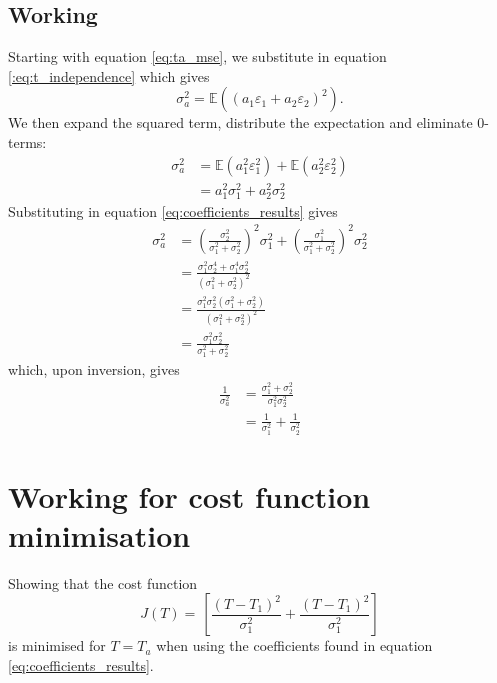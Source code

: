 \subsection{Working}
\label{sub:analysis:working}

Starting with equation \ref{eq:ta_mse}, we substitute in equation \ref{:eq:t_independence} which gives
\begin{equation*}
    \sigma_a^2 = \mathbb{E} \left( \left( a_1 \varepsilon_1 + a_2 \varepsilon_2 \right)^2 \right).
\end{equation*}
We then expand the squared term, distribute the expectation and eliminate $0$-terms:
\begin{align*}
    \sigma_a^2 &= \mathbb{E} \left( a_1^2 \varepsilon_1^2 \right) + \mathbb{E} \left( a_2^2 \varepsilon_2^2 \right) \\
                &= a_1^2 \sigma_1^2 + a_2^2 \sigma_2^2
\end{align*}
Substituting in equation \ref{eq:coefficients_results} gives
\begin{align*}
    \sigma_a^2 &= \left( \frac{\sigma_2^2}{\sigma_1^2 + \sigma_2^2} \right)^2 \sigma_1^2 + \left( \frac{\sigma_1^2}{\sigma_1^2 + \sigma_2^2} \right)^2 \sigma_2^2 \\
                &= \frac{\sigma_1^2 \sigma_2^4 + \sigma_1^4 \sigma_2^2}{\left( \sigma_1^2 + \sigma_2^2 \right)^2} \\
                &= \frac{\sigma_1^2 \sigma_2^2 \left(\sigma_1^2 + \sigma_2^2 \right)}{\left(\sigma_1^2 + \sigma_2^2 \right)^2} \\
                &= \frac{\sigma_1^2 \sigma_2^2}{\sigma_1^2 + \sigma_2^2}
\end{align*}
which, upon inversion, gives
\begin{align}
    \frac{1}{\sigma_a^2} &= \frac{\sigma_1^2 + \sigma_2^2}{\sigma_1^2 \sigma_2^2} \nonumber \\
                            &= \frac{1}{\sigma_1^2} + \frac{1}{\sigma_2^2}
\end{align}

\section{Working for cost function minimisation}
\label{sec:kalnay_working:cost}

Showing that the cost function
\begin{equation*}
    J(T) = \frac{}{} \left[ \frac{\left( T - T_1 \right)^2}{\sigma_1^2} + \frac{\left( T - T_1 \right)^2}{\sigma_1^2} \right]
\end{equation*}
is minimised for $T = T_a$ when using the coefficients found in equation \ref{eq:coefficients_results}.

